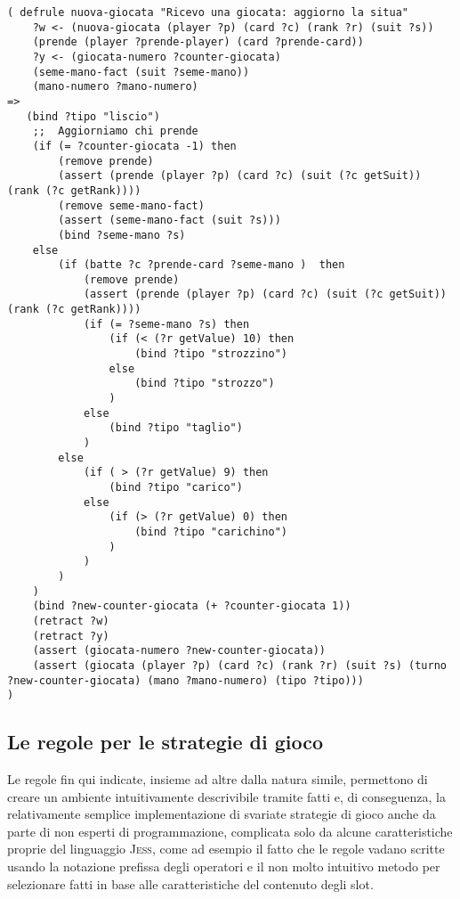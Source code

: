 \begin{lstlisting}[caption={Regola che analizza una nuova giocata ricevuta, la classifica e aggiorna alcuni fatti temporanei},label=nuovagiocata]
   ( defrule nuova-giocata "Ricevo una giocata: aggiorno la situa"
    ?w <- (nuova-giocata (player ?p) (card ?c) (rank ?r) (suit ?s))
    (prende (player ?prende-player) (card ?prende-card))
    ?y <- (giocata-numero ?counter-giocata)
    (seme-mano-fact (suit ?seme-mano))
    (mano-numero ?mano-numero)
=>
   (bind ?tipo "liscio") 
    ;;  Aggiorniamo chi prende
    (if (= ?counter-giocata -1) then
        (remove prende)
        (assert (prende (player ?p) (card ?c) (suit (?c getSuit)) (rank (?c getRank))))
        (remove seme-mano-fact)
        (assert (seme-mano-fact (suit ?s)))
        (bind ?seme-mano ?s)
    else
        (if (batte ?c ?prende-card ?seme-mano )  then
            (remove prende)
            (assert (prende (player ?p) (card ?c) (suit (?c getSuit)) (rank (?c getRank))))
            (if (= ?seme-mano ?s) then
                (if (< (?r getValue) 10) then
                    (bind ?tipo "strozzino")
                else
                    (bind ?tipo "strozzo")
                )
            else
                (bind ?tipo "taglio")
            )
        else
            (if ( > (?r getValue) 9) then
                (bind ?tipo "carico")
            else
                (if (> (?r getValue) 0) then
                    (bind ?tipo "carichino")
                )
            )
        )
    )
    (bind ?new-counter-giocata (+ ?counter-giocata 1))
    (retract ?w)
    (retract ?y)
    (assert (giocata-numero ?new-counter-giocata))
    (assert (giocata (player ?p) (card ?c) (rank ?r) (suit ?s) (turno ?new-counter-giocata) (mano ?mano-numero) (tipo ?tipo)))
)
\end{lstlisting} 


\subsection{Le regole per le strategie di gioco}

Le regole fin qui indicate, insieme ad altre dalla natura simile, permettono di creare un ambiente intuitivamente descrivibile tramite fatti e, di conseguenza, la relativamente semplice implementazione di svariate strategie di gioco anche da parte di non esperti di programmazione, complicata solo da alcune caratteristiche proprie del linguaggio \textsc{Jess}, come ad esempio il fatto che le regole vadano scritte usando la notazione prefissa degli operatori e il non molto intuitivo metodo per selezionare fatti in base alle caratteristiche del contenuto degli slot.\\


